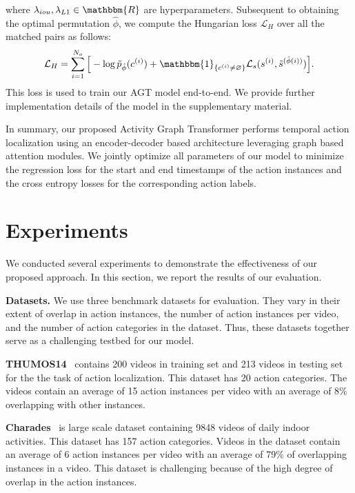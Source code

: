 \documentclass[10pt,twocolumn,letterpaper]{article}
\begin{document}
where $\lambda_{iou}, \lambda_{L1} \in \mathbbm{R}$ are hyperparameters. Subsequent to obtaining the optimal permutation $\hat \phi$, we compute the Hungarian loss $\mathcal{L}_H$ over all the matched pairs as follows:
\begin{equation}
\label{eq:loss}
\mathcal{L}_H = \sum_{i=1}^{N_o} \Big[-\log \tilde p_{\hat\phi} (c^{(i)})
 + \mathbbm{1}_{\{c^{(i)} \neq \varnothing\}} \mathcal{L}_s(s^{(i)},  \tilde s^{(\hat\phi(i))})\Big].
\end{equation}
This loss is used to train our AGT model end-to-end. We provide further implementation details of the model in the supplementary material.

In summary, our proposed Activity Graph Transformer performs temporal action localization using an encoder-decoder based architecture leveraging graph based attention modules. We jointly optimize all parameters of our model to minimize the regression loss for the start and end timestamps of the action instances and the cross entropy losses for the corresponding action labels.  




 
\section{Experiments}
We conducted several experiments to demonstrate the effectiveness of our proposed approach. In this section, we report the results of our evaluation.

\vspace{0.05in}
\noindent
\textbf{Datasets.} We use three benchmark datasets for evaluation. They vary in their extent of overlap in action instances, the number of action instances per video, and the number of action categories in the dataset. Thus, these datasets together serve as a challenging testbed for our model.

\textbf{THUMOS14}~\cite{THUMOS14} contains 200 videos in training set and 213 videos in testing set for the the task of action localization. This dataset has 20 action categories. The videos contain an average of 15 action instances per video with an average of 8\%  overlapping with other instances.

\textbf{Charades}~\cite{sigurdsson2016hollywood} is large scale dataset containing 9848 videos of daily indoor activities. This dataset has 157 action categories. Videos in the dataset contain an average of 6 action instances per video with an average of 79\% of overlapping instances in a video. This dataset is challenging because of the high degree of overlap in the action instances. 
\end{document}
